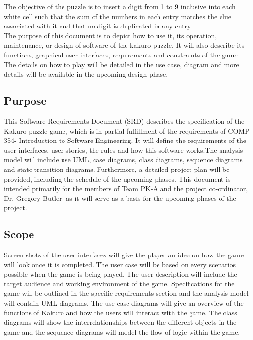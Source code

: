 \documentclass[12pt]{article}
\begin{document}
The objective of the puzzle is to insert a digit from 1 to 9 inclusive into each white cell such that the sum of the numbers in each entry matches the clue associated with it and that no digit is duplicated in any entry. \\

The purpose of this document  is to depict how to use it, its operation, maintenance, or design of software of the kakuro puzzle. It will also describe its functions, graphical user interfaces, requirements and constraints of the game. The details on how to play will be detailed in the use case, diagram and more details will be available in the upcoming design phase.\\


\subsection{Purpose}

This Software Requirements Document (SRD) describes the specification of the Kakuro puzzle game, which is in partial fulfillment of the requirements of COMP 354- Introduction to Software Engineering. It will define the requirements of the user interfaces, user stories, the rules and how this software works.The analysis model will include use UML, case diagrams, class diagrams, sequence diagrams and state transition diagrams. Furthermore, a detailed
project plan will be provided, including the schedule of the upcoming phases. This document is intended primarily for the members of  Team PK-A and the project co-ordinator, Dr. Gregory Butler, as it will serve as a basis for the upcoming phases of the project.
 

\subsection{Scope}

Screen shots of the user interfaces will give the player an idea on how the game will look once it is completed. The user case will be based on every scenarios possible when the game is being played. The user description will include the target audience and working environment of the game. Specifications for the game will be outlined in the specific requirements section and the analysis model will contain UML diagrams. The use case diagrams will give an overview of the functions of Kakuro and how the users will interact with the game. The class diagrams will show the interrelationships between the different objects in the game and the sequence diagrams will model the flow of logic within the game.
\end{document}
